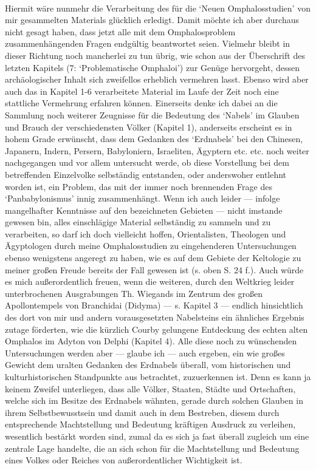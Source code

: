 \documentclass[a4paper, 11pt, oneside]{article}
\begin{document}
\paragraph{}
Hiermit wäre nunmehr die Verarbeitung des für die `Neuen Omphalosstudien' von mir gesammelten Materials glücklich erledigt. Damit möchte ich aber durchaus nicht gesagt haben, dass jetzt alle mit dem Omphalosproblem zusammenhängenden Fragen endgültig beantwortet seien. Vielmehr bleibt in dieser Richtung noch mancherlei zu tun übrig, wie schon aus der Überschrift des letzten Kapitels (7: `Problematische Omphaloi') zur Genüge hervorgeht, dessen archäologischer Inhalt sich zweifellos erheblich vermehren lasst. Ebenso wird aber auch das in Kapitel 1-6 verarbeitete Material im Laufe der Zeit noch eine stattliche Vermehrung erfahren können. Einerseits denke ich dabei an die Sammlung noch weiterer Zeugnisse für die Bedeutung des `Nabels' im Glauben und Brauch der verschiedensten Völker (Kapitel 1), anderseits erscheint es in hohem Grade erwünscht, dass dem Gedanken des `Erdnabels' bei den Chinesen, Japanern, Indern, Persern, Babyloniern, Israeliten, Ägyptern etc. etc. noch weiter nachgegangen und vor allem untersucht werde, ob diese Vorstellung bei dem betreffenden Einzelvolke selbständig entstanden, oder anderswoher entlehnt worden ist, ein Problem, das mit der immer noch brennenden Frage des `Panbabylonismus' innig zusammenhängt. Wenn ich auch leider --- infolge mangelhafter Kenntnisse auf den bezeichneten Gebieten --- nicht imstande gewesen bin, alles einschlägige Material selbständig zu sammeln und zu verarbeiten, so darf ich doch vielleicht hoffen, Orientalisten, Theologen und Ägyptologen durch meine Omphalosstudien zu eingehenderen Untersuchungen ebenso wenigstens angeregt zu haben, wie es auf dem Gebiete der Keltologie zu meiner großen Freude bereits der Fall gewesen ist (s. oben S. 24 f.). Auch würde es mich außerordentlich freuen, wenn die weiteren, durch den Weltkrieg leider unterbrochenen Ausgrabungen Th. Wiegands im Zentrum des großen Apollontempels von Branchidai (Didyma) --- s. Kapitel 3 --- endlich hinsichtlich des dort von mir und andern vorausgesetzten Nabelsteins ein ähnliches Ergebnis zutage förderten, wie die kürzlich Courby gelungene Entdeckung des echten alten Omphalos im Adyton von Delphi (Kapitel 4). Alle diese noch zu wünschenden Untersuchungen werden aber --- glaube ich --- auch ergeben, ein wie großes Gewicht dem uralten Gedanken des Erdnabels überall, vom historischen und kulturhistorischen Standpunkte aus betrachtet, zuzuerkennen ist. Denn es kann ja keinem Zweifel unterliegen, dass alle Völker, Staaten, Städte und Ortschaften, welche sich im Besitze des Erdnabels wähnten, gerade durch solchen Glauben in ihrem Selbstbewusstsein und damit auch in dem Bestreben, diesem durch entsprechende Machtstellung und Bedeutung kräftigen Ausdruck zu verleihen, wesentlich bestärkt worden sind, zumal da es sich ja fast überall zugleich um eine zentrale Lage handelte, die an sich schon für die Machtstellung und Bedeutung eines Volkes oder Reiches von außerordentlicher Wichtigkeit ist.
\end{document}
